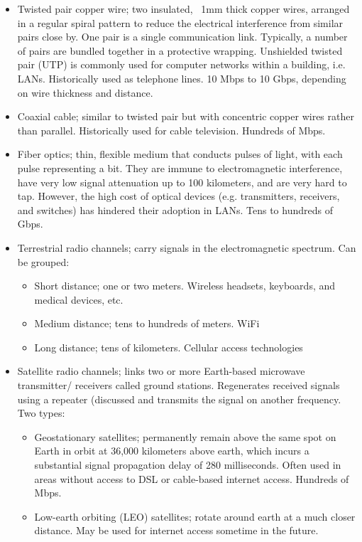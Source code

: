\documentclass[table, xcdraw]{article}%
\begin{document}
\begin{itemize}
    \item Twisted pair copper wire; two insulated, ~1mm thick copper wires, arranged in a regular spiral pattern to reduce the electrical interference from similar pairs close by. One pair is a single communication link. Typically, a number of pairs are bundled together in a protective wrapping. Unshielded twisted pair (UTP) is commonly used for computer networks within a building, i.e. LANs. Historically used as telephone lines. 10 Mbps to 10 Gbps, depending on wire thickness and distance.
    \item Coaxial cable; similar to twisted pair but with concentric copper wires rather than parallel. Historically used for cable television. Hundreds of Mbps.
    \item Fiber optics;  thin, flexible medium that conducts pulses of light, with each pulse representing a bit. They are immune to electromagnetic interference, have very low signal attenuation up to 100 kilometers, and are very hard to tap. However, the high cost of optical devices (e.g. transmitters, receivers, and switches) has hindered their adoption in LANs. Tens to hundreds of Gbps.
    \item Terrestrial radio channels; carry signals in the electromagnetic spectrum. Can be grouped:
    \begin{itemize}
        \item Short distance; one or two meters. Wireless headsets, keyboards, and medical devices, etc.
        \item Medium distance; tens to hundreds of meters. WiFi
        \item Long distance; tens of kilometers.  Cellular access technologies
    \end{itemize}
    \item Satellite radio channels; links two or more Earth-based microwave transmitter/ receivers called ground stations. Regenerates received signals using a repeater (discussed and transmits the signal on another frequency. Two types:
    \begin{itemize}
        \item Geostationary satellites; permanently remain above the same spot on Earth in orbit at 36,000 kilometers above earth, which incurs a substantial signal propagation delay of 280 milliseconds. Often used in areas without access to DSL or cable-based internet access. Hundreds of Mbps.
        \item Low-earth orbiting (LEO) satellites; rotate around earth at a much closer distance. May be used for internet access sometime in the future.
    \end{itemize}
\end{itemize}
\end{document}
